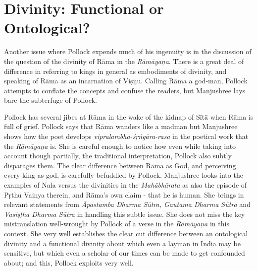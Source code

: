 \section*{Divinity: Functional or Ontological?}

Another issue where Pollock expends much of his ingenuity is in the discussion of the question of the divinity of Rāma in the {\sl Rāmāyaṇa}. There is a great deal of difference in referring to kings in general as embodiments of divinity, and speaking of Rāma as an incarnation of Viṣṇu. Calling Rāma a god-man, Pollock attempts to conflate the concepts and confuse the readers, but Manjushree lays bare the subterfuge of Pollock.

Pollock has several jibes at Rāma in the wake of the kidnap of Sītā when Rāma is full of grief. Pollock says that Rāma wanders like a madman but Manjushree shows how the poet develops {\sl vipralambha-śṛṅgāra-rasa} in the poetical work that the {\sl Rāmāyaṇa} is. She is careful enough to notice how even while taking into account though partially, the traditional interpretation, Pollock also subtly disparages them. The clear difference between Rāma as God, and perceiving every king as god, is carefully befuddled by Pollock. Manjushree looks into the examples of Nala versus the divinities in the {\sl Mahābhārata} as also the episode of Pṛthu Vainya therein, and Rāma's own claim - that he is human. She brings in relevant statements from {\sl Āpastamba Dharma Sūtra, Gautama Dharma Sūtra} and {\sl Vasiṣṭha Dharma Sūtra} in handling this subtle issue. She does not miss the key mistranslation well-wrought by Pollock of a verse in the {\sl Rāmāyaṇa} in this context. She very well establishes the clear cut difference between an ontological divinity and a functional divinity about which even a layman in India may be sensitive, but which even a scholar of our times can be made to get confounded about; and this, Pollock exploits very well.\\[-20pt]

